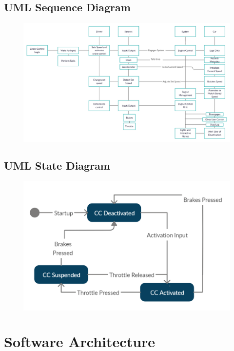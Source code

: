 \documentclass{article}
\begin{document}
	\subsection{UML Sequence Diagram}
	\begin{figure}[!htb]
		\centering
		\includegraphics[scale=0.18]{cs347_sequence}
	\end{figure}
	
	\newpage
	\subsection{UML State Diagram}
	\begin{figure}[!htb]
		\centering
		\includegraphics[scale=.55]{cs347_state}
	\end{figure}
	
	\newpage
	\section{Software Architecture}
	
\end{document}
